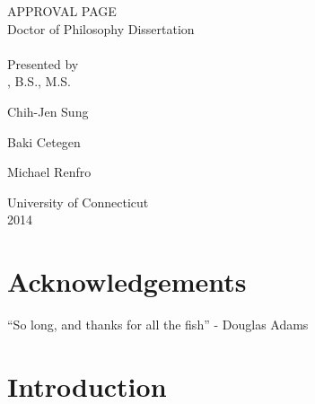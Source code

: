 \documentclass[12pt,letterpaper,oneside,draft]{book}
\begin{document}
\setcounter{page}{1}
\begin{center}
APPROVAL PAGE \\
Doctor of Philosophy Dissertation \\
\thetitle \\
\blankline \blankline
Presented by \\
\theauthor, B.S., M.S. \\
\end{center}
\blankline
{}
\vspace{-0.5\baselineskip}
\begin{center}
Chih-Jen Sung
\end{center}
\blankline
{}
\vspace{-0.5\baselineskip}
\begin{center}
Baki Cetegen
\end{center}
\blankline
{}
\vspace{-0.5\baselineskip}
\begin{center}
Michael Renfro
\end{center}
\blankline \blankline \blankline \blankline \blankline
\begin{center}
University of Connecticut \\
2014
\end{center}
\newpage

{}
\chapter*{Acknowledgements}
``So long, and thanks for all the fish'' - Douglas Adams

\cleardoublepage
{}
\tableofcontents

\cleardoublepage
{}
\listoffigures

\cleardoublepage
{}
\listoftables

\cleardoublepage
\setcounter{page}{1}

\chapter{Introduction}
\label{chap:intro}

\cleardoublepage

\end{document}
